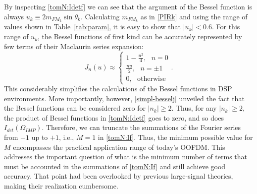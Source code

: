 \documentclass[journal]{IEEEtran}
\begin{document}
By inspecting \eqref{tomN:Idetf} we can see that the argument of the Bessel function is always $u_k \equiv 2m_{FM_k}\sin{\theta_k}$. Calculating $m_{FM_k}$ as in \eqref{PIRk} and using the range of values shown in Table~\ref{tab:param}, it is easy to show that $|u_k| < 0.6$. For this range of $u_k$, the Bessel functions of first kind can be accurately represented by few terms of their Maclaurin series expansion:
\setcounter{equation}{4}
\begin{equation} \label{simpl-besselj}
J_n(u) \approx
\begin{cases} 
1 - \frac{u^2}{4},~~~n = 0 \\
\frac{nu}{2},~~~n = \pm 1 \\
0,~~~\text{otherwise}
\end{cases}.
\end{equation}
This considerably simplifies the calculations of the Bessel functions in DSP environments. More importantly, however, \eqref{simpl-besselj} unveiled the fact that the Bessel functions can be considered zero for $|n_k|\geq 2$. Thus, for any $|n_k| \geq 2$, the product of Bessel functions in \eqref{tomN:Idetf} goes to zero, and so does $I_{det}(\Omega_{IMP})$. Therefore, we can truncate the summations of the Fourier series from $-1$ up to $+1$, i.e., $M = 1$ in \eqref{tomN:If}. Thus, the minimum possible value for $M$ encompasses the practical application range of today's OOFDM. This addresses the important question of what is the minimum number of terms that must be accounted in the summations of \eqref{tomN:If} and still achieve good accuracy. That point had been overlooked by previous large-signal theories, making their realization cumbersome.
\end{document}
